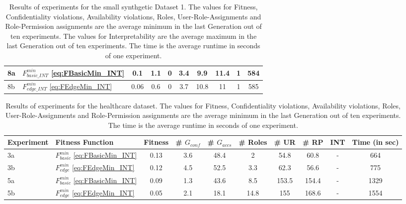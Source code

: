 \begin{landscape}
\begin{table}
\begin{tabular}{|l|l|c|c|c|c|c|c|c|c|}
            8a & $F_{basic\_INT}^{min}$ \eqref{eq:FBasicMin_INT}   &   0.1  &   1.1   &   0   &   3.4   &   9.9   &   11.4   &   1   &   584\\ \hline
            8b & $F_{edge\_INT}^{min}$ \eqref{eq:FEdgeMin_INT}   &   0.06   &   0.6   &   0   &   3.7   &   10.8   &   11   &   1   &   585\\ \hline
        \end{tabular}
        \caption{Results of experiments for the small synthgetic Dataset 1. The values for Fitness, Confidentiality violations, Availability violations, Roles, User-Role-Assignments and Role-Permission assignments are the average minimum in the last Generation out of ten experiments. The values for Interpretability are the average maximum in the last Generation out of ten experiments. The time is the average runtime in seconds of one experiment.}
        \label{tab:results_exp2_dataset1}
    \end{table}
    \begin{table}
        \centering
        \begin{tabular}{|l|l|c|c|c|c|c|c|c|c|}
            \hline
            \rowcolor{myGray} 
            \textbf{Experiment} & \textbf{Fitness Function} & \textbf{Fitness} & \textbf{\# $G_{conf}$} & \textbf{\# $G_{accs}$} & \textbf{\# Roles} & \textbf{\# UR} & \textbf{\# RP} & \textbf{INT} & \textbf{Time (in sec)}\\ \hline
            3a & $F_{basic}^{min}$ \eqref{eq:FBasicMin_INT}   &   0.13   &   3.6   &   48.4   &   2   &   54.8   &   60.8   &   -   & 664\\ \hline
            3b & $F_{edge}^{min}$ \eqref{eq:FEdgeMin_INT}   &   0.12   &   4.5   &   52.5   &   3.3   &   62.3   &   56.6   &   -   & 775\\ \hline
            5a & $F_{basic}^{min}$ \eqref{eq:FBasicMin_INT}   &   0.09   &   1.3   &   43.6   &   8.5   &   153.5   &   154.4   &   -   & 1329\\ \hline
            5b & $F_{edge}^{min}$ \eqref{eq:FEdgeMin_INT}   &   0.05   &   2.1   &   18.1   &   14.8   &   155   &   168.6   &   -   & 1554\\ \hline
        \end{tabular}
        \caption{Results of experiments for the healthcare dataset. The values for Fitness, Confidentiality violations, Availability violations, Roles, User-Role-Assignments and Role-Permission assignments are the average minimum in the last Generation out of ten experiments. The time is the average runtime in seconds of one experiment.}
        \label{tab:results_exp2_healthcare}
    \end{table}
\end{landscape}
